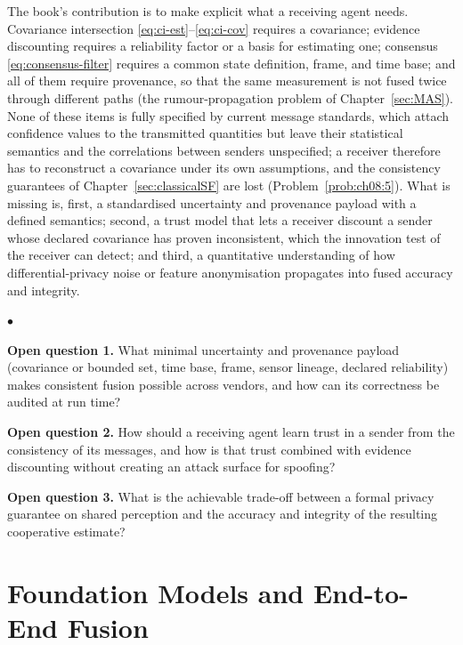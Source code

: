 \documentclass[graybox,envcountchap]{style/SNmono}
\newenvironment{list4a}{
  \begin{list}{$\bullet$}{
      \setlength{\itemsep}{0.05cm}
      \setlength{\labelsep}{0.2cm}
      \setlength{\labelwidth}{0.3cm}
      \setlength{\parsep}{0in}
      \setlength{\parskip}{0in}
      \setlength{\topsep}{0in}
      \setlength{\partopsep}{0in}
      \setlength{\leftmargin}{0.16in}}}
      {\end{list}}
\begin{document}
The book's contribution is to make explicit what a receiving agent needs. Covariance intersection \eqref{eq:ci-est}--\eqref{eq:ci-cov} requires a covariance; evidence discounting requires a reliability factor or a basis for estimating one; consensus \eqref{eq:consensus-filter} requires a common state definition, frame, and time base; and all of them require provenance, so that the same measurement is not fused twice through different paths (the rumour-propagation problem of Chapter~\ref{sec:MAS}). None of these items is fully specified by current message standards, which attach confidence values to the transmitted quantities but leave their statistical semantics and the correlations between senders unspecified; a receiver therefore has to reconstruct a covariance under its own assumptions, and the consistency guarantees of Chapter~\ref{sec:classicalSF} are lost (Problem~\ref{prob:ch08:5}). What is missing is, first, a standardised uncertainty and provenance payload with a defined semantics; second, a trust model that lets a receiver discount a sender whose declared covariance has proven inconsistent, which the innovation test of the receiver can detect; and third, a quantitative understanding of how differential-privacy noise or feature anonymisation propagates into fused accuracy and integrity.

\begin{list4a}
    \item \textbf{Open question 1.} What minimal uncertainty and provenance payload (covariance or bounded set, time base, frame, sensor lineage, declared reliability) makes consistent fusion possible across vendors, and how can its correctness be audited at run time?
    \item \textbf{Open question 2.} How should a receiving agent learn trust in a sender from the consistency of its messages, and how is that trust combined with evidence discounting without creating an attack surface for spoofing?
    \item \textbf{Open question 3.} What is the achievable trade-off between a formal privacy guarantee on shared perception and the accuracy and integrity of the resulting cooperative estimate?
\end{list4a}

\section{Foundation Models and End-to-End Fusion}
\label{subsec:oc-foundation}
\end{document}
